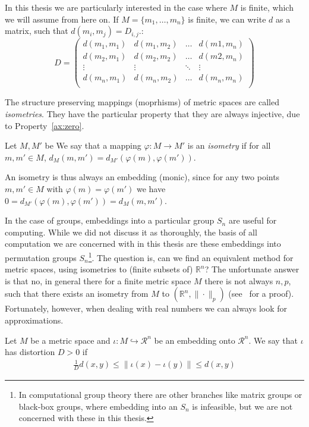 In this thesis we are particularly interested in the case where $M$ is finite, which we will assume from here on. 
If $M = \{ m_1, \ldots, m_n \}$ is finite, we can write $d$ as a matrix, such that $d(m_i,m_j) = D_{i,j}$.:
\begin{equation*}
    D = 
\left(
\begin{array}{cccc}
d(m_1,m_1) & d(m_1,m_2) & \ldots & d(m1,m_n) \\
d(m_2,m_1) & d(m_2,m_2) & \ldots & d(m2,m_n) \\
\vdots & \vdots & \ddots & \vdots \\
d(m_n,m_1) & d(m_n,m_2) & \ldots & d(m_n,m_n) \\
\end{array}
\right)
\end{equation*}

The structure preserving mappings (moprhisms) of metric spaces are called \emph{isometries}. They have the particular property that they are always injective, due to Property~\ref{ax:zero}.
\begin{defn}
Let $M,M'$ be We say that a mapping $\varphi : M \rightarrow M'$ is an \emph{isometry} if for all $m,m' \in M$, $d_M(m,m') = d_{M'}(\varphi(m),\varphi(m'))$.
\end{defn}
An isometry is thus always an embedding (monic), since for any two points $m,m' \in M$ with $\varphi(m) = \varphi(m')$ we have $0 = d_{M'}(\varphi(m),\varphi(m')) = d_{M}(m,m')$.

In the case of groups, embeddings into a particular group $S_n$ are useful for computing.
While we did not discuss it as thoroughly, the basis of all computation we are concerned with in this thesis are these embeddings into permutation groups 
$S_n$\footnote{In computational group theory there are other branches like matrix groups or black-box groups, where embedding into an $S_n$ is infeasible,
but we are not concerned with these in this thesis.}.
The question is, can we find an equivalent method for metric spaces, using isometries to (finite subsets of) $\mathbb{R}^n$? 
The unfortunate answer is that no, in general there for a finite metric space $M$ there is not always $n,p$, such that there exists an isometry from $M$ to $(\mathbb{R}^n,\|\cdot\|_p)$ (see~\cite{matouvsek} for a proof).
Fortunately, however, when dealing with real numbers we can always look for approximations.

\begin{defn}
Let $M$ be a metric space and $\iota: M \hookrightarrow \mathcal{R}^n$ be an embedding onto $\mathcal{R}^n$. 
We say that $\iota$ has distortion $D > 0$ if 
\begin{align}\label{eqn:distortion} \frac{1}{D} d(x,y) \leq \| \iota(x) - \iota(y) \| \leq d(x,y) \end{align}
\end{defn}

